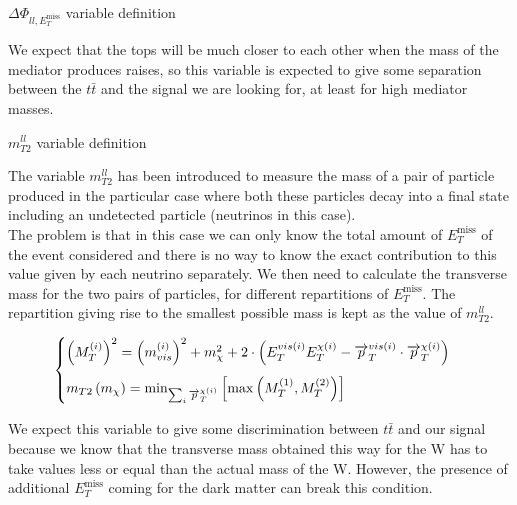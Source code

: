 \documentclass[handout,8 pt]{beamer}
\begin{document}
\begin{frame}{$\Delta \Phi_{ll, E_T^{\text{miss}}}$ variable definition}
   \begin{block}{}
   \vspace{5pt}
   \justifying
   We expect that the tops will be much closer to each other when the mass of the mediator produces raises, so this variable is expected to give some separation between the $t \bar t$ and the signal we are looking for, at least for high mediator masses. \vspace{5pt}
   \end{block} \vfill

\end{frame}


\begin{frame}{$m_{T2}^{ll}$ variable definition}

   	\justifying
	The variable $m_{T2}^{ll}$ has been introduced to measure the mass of a pair of particle produced in the particular case where both these particles decay into a final state including an undetected particle (neutrinos in this case). \\ \vspace{8pt}
	The problem is that in this case we can only know the total amount of $E_T^{\text{miss}}$ of the event considered and there is no way to know the exact contribution to this value given by each neutrino separately. We then need to calculate the transverse mass for the two pairs of particles, for different repartitions of $E_T^{\text{miss}}$. The repartition giving rise to the smallest possible mass is kept as the value of $m_{T2}^{ll}$. \\ \vspace{8pt}
	
\begin{equation*}
	\begin{cases}
	\vspace{8pt}
	\left(M_T^{(i)}\right)^2 = \left(m_{vis}^{(i)}\right)^2 + m_{\chi}^2 + 2 \cdot \left(E_{T}^{vis(i)} E_{T}^{\chi(i)} - \overrightarrow{p}_{T}^{vis(i)} \cdot \overrightarrow{p}_{T}^{\chi(i)}\right) \\ 
m_{T2}\left(m_\chi \right) = \min_{\sum_{i}{\overrightarrow{p}_{T}^{\chi(i)}}}\left[{\max{\left(M_T^{(1)}, M_T^{(2)}\right)}}\right]
	\end{cases}
\end{equation*}
	
	\begin{block}{}
	\vspace{5pt}
	\justifying
	We expect this variable to give some discrimination between $t \bar t$ and our signal because we know that the transverse mass obtained this way for the W has to take values less or equal than the actual mass of the W. However, the presence of additional $E_T^{\text{miss}}$ coming for the dark matter can break this condition. \vspace{5pt}
	\end{block} \vfill

\end{frame}
\end{document}
